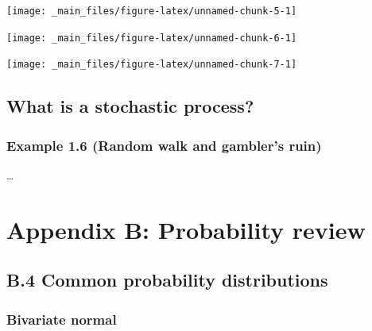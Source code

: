 \documentclass[
  11pt]{report}
\begin{document}
\begin{center}\texttt{[image: \_main\_files/figure-latex/unnamed-chunk-5-1]} \end{center}

\begin{center}\texttt{[image: \_main\_files/figure-latex/unnamed-chunk-6-1]} \end{center}

\begin{center}\texttt{[image: \_main\_files/figure-latex/unnamed-chunk-7-1]} \end{center}

\hypertarget{what-is-a-stochastic-process}{%
\section{What is a stochastic process?}\label{what-is-a-stochastic-process}}

\hypertarget{example-1.6-random-walk-and-gamblers-ruin}{%
\subsection*{Example 1.6 (Random walk and gambler's ruin)}\label{example-1.6-random-walk-and-gamblers-ruin}}

\ldots{}

\hypertarget{prob-review}{%
\chapter*{Appendix B: Probability review}\label{prob-review}}

\hypertarget{b.4-common-probability-distributions}{%
\section*{B.4 Common probability distributions}\label{b.4-common-probability-distributions}}

\hypertarget{bivariate-normal}{%
\subsection*{Bivariate normal}\label{bivariate-normal}}
\end{document}
